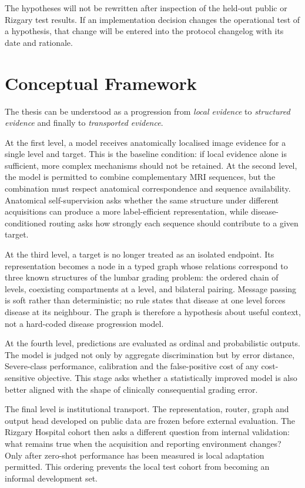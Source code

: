 The hypotheses will not be rewritten after inspection of the held-out public or
Rizgary test results. If an implementation decision changes the operational test of
a hypothesis, that change will be entered into the protocol changelog with its date
and rationale.

\section{Conceptual Framework}
\label{sec:intro-conceptual}

The thesis can be understood as a progression from \emph{local evidence} to
\emph{structured evidence} and finally to \emph{transported evidence}.

At the first level, a model receives anatomically localised image evidence for a
single level and target. This is the baseline condition: if local evidence alone is
sufficient, more complex mechanisms should not be retained. At the second level,
the model is permitted to combine complementary MRI sequences, but the combination
must respect anatomical correspondence and sequence availability. Anatomical
self-supervision asks whether the same structure under different acquisitions can
produce a more label-efficient representation, while disease-conditioned routing
asks how strongly each sequence should contribute to a given target.

At the third level, a target is no longer treated as an isolated endpoint. Its
representation becomes a node in a typed graph whose relations correspond to three
known structures of the lumbar grading problem: the ordered chain of levels,
coexisting compartments at a level, and bilateral pairing. Message passing is soft
rather than deterministic; no rule states that disease at one level forces disease
at its neighbour. The graph is therefore a hypothesis about useful context, not a
hard-coded disease progression model.

At the fourth level, predictions are evaluated as ordinal and probabilistic outputs.
The model is judged not only by aggregate discrimination but by error distance,
Severe-class performance, calibration and the false-positive cost of any
cost-sensitive objective. This stage asks whether a statistically improved model is
also better aligned with the shape of clinically consequential grading error.

The final level is institutional transport. The representation, router, graph and
output head developed on public data are frozen before external evaluation. The
Rizgary Hospital cohort then asks a different question from internal validation:
what remains true when the acquisition and reporting environment changes? Only
after zero-shot performance has been measured is local adaptation permitted. This
ordering prevents the local test cohort from becoming an informal development set.

